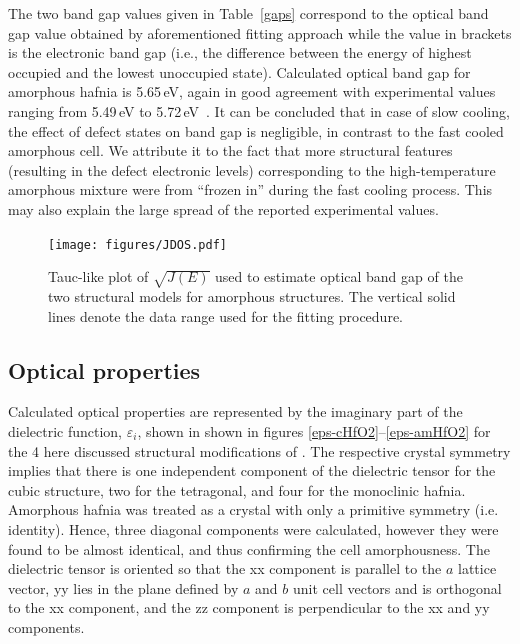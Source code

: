 \documentclass[10pt,a4paper,twocolumn]{article}
\begin{document}
The two band gap values given in Table~\ref{gaps} correspond to the optical band gap value obtained by aforementioned fitting approach while the value in brackets is the electronic band gap (i.e., the difference between the energy of highest occupied and the lowest unoccupied state).
Calculated optical band gap for amorphous hafnia is 5.65\,eV, again in good agreement with experimental values ranging from 5.49\,eV to 5.72\,eV~\cite{Takeuchi2004, Nguyen2005, Perevalov2007}.
It can be concluded that in case of slow cooling, the effect of defect states on band gap is negligible, in contrast to the fast cooled amorphous cell. We attribute it to the fact that more structural features (resulting in the defect electronic levels) corresponding to the high-temperature amorphous mixture were from ``frozen in'' during the fast cooling process.
This may also explain the large spread of the reported experimental values.

\begin{figure}
\begin{center}
	\texttt{[image: figures/JDOS.pdf]}
	\caption{Tauc-like plot of $\sqrt{J(E)}$ used to estimate optical band gap of the two structural models for amorphous structures. The vertical solid lines denote the data range used for the fitting procedure.}
   \label{JDOS}
\end{center}
\end{figure}



\subsection{Optical properties}

Calculated optical properties are represented by the imaginary part of the dielectric function, $\varepsilon_i$, shown in shown in figures \ref{eps-cHfO2}--\ref{eps-amHfO2} for the 4 here discussed structural modifications of .
The respective crystal symmetry implies that there is one independent component of the dielectric tensor for the cubic structure, two for the tetragonal, and four for the monoclinic hafnia.
Amorphous hafnia was treated as a crystal with only a primitive symmetry (i.e. identity). 
Hence, three diagonal components were calculated, however they were found to be almost identical, and thus confirming the cell amorphousness.
The dielectric tensor is oriented so that the xx component is parallel to the $a$ lattice vector, yy lies in the plane defined by $a$ and $b$ unit cell vectors and is orthogonal to the xx component, and the zz component is perpendicular to the xx and yy components.
\end{document}
